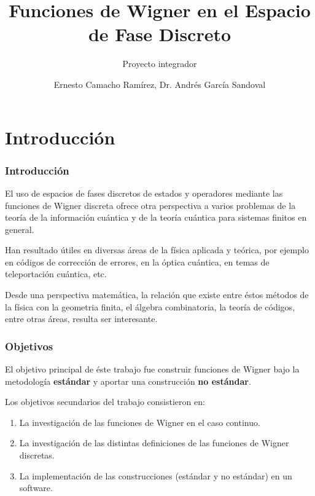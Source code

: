 \documentclass[10pt]{beamer}
\title{Funciones de Wigner en el Espacio de Fase Discreto}
\subtitle{Proyecto integrador}
\author{Ernesto Camacho Ramírez, Dr. Andrés García Sandoval}
\institute{
  Centro Universitario de Ciencias Exactas e Ingenierías
  \and
  Universidad de Guadalajara
}
\begin{document}
  \maketitle

  \section{Introducción}

  \begin{frame}
    \frametitle{Introducción}

    El uso de espacios de fases discretos de
    estados y operadores mediante las funciones de Wigner
    discreta ofrece otra perspectiva a varios problemas de
    la teoría de la información cuántica y de la teoría
    cuántica para sistemas finitos en general.

    \vspace{15pt}

    \pause

    Han resultado útiles en diversas áreas de la física
    aplicada y teórica, por ejemplo en códigos de corrección
    de errores, en la óptica cuántica, en temas de
    teleportación cuántica, etc. 

    \vspace{15pt}

    \pause

    Desde una perspectiva matemática, la relación que existe
    entre éstos métodos de la física con la geometria
    finita, el álgebra combinatoria, la teoría de códigos,
    entre otras áreas, resulta ser interesante.
  \end{frame}

  \begin{frame}
    \frametitle{Objetivos}

    El objetivo principal de éste trabajo fue construir
    funciones de Wigner bajo la metodología
    \textbf{estándar} y aportar una construcción \textbf{no
    estándar}.

    \vspace{10pt}

    Los objetivos secundarios del trabajo consistieron en:
    \begin{enumerate}
      \item La investigación de las funciones de Wigner en
        el caso continuo.
      \item La investigación de las distintas definiciones
        de las funciones de Wigner discretas.
      \item La implementación de las construcciones
        (estándar y no estándar) en un software.
    \end{enumerate}
  \end{frame}
\end{document}
